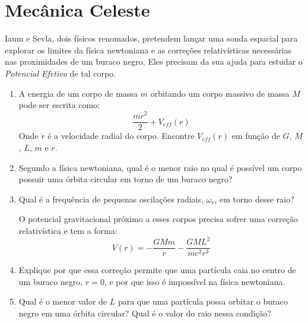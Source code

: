 \documentclass[11pt]{article}
\begin{document}
\section{Mecânica Celeste}
\begin{pproblem}
    Iaum e Sevla, dois físicos renomados, pretendem lançar uma sonda espacial para explorar os limites da física newtoniana e as correções relativísticas necessárias nas proximidades de um buraco negro. Eles precisam da sua ajuda para estudar o \textit{Potencial Efetivo} de tal corpo.
    \begin{enumerate}[label=\textbf{\alph*)}]
        \item A energia de um corpo de massa \(m\) orbitando um corpo massivo de massa \(M\) pode ser escrita como:
             \[
             \frac{m\dot r ^2}{2} + V_{eff}(r)
             \]
             Onde \(\dot r\) é a velocidade radial do corpo. Encontre \(V_{eff}(r)\) em função de \(G\), \(M\), \(L\), \(m\) e \(r\).

        \item Segundo a física newtoniana, qual é o menor raio no qual é possível um corpo possuir uma órbita circular em torno de um buraco negro?
    
        \item Qual é a frequência de pequenas oscilações radiais, \(\omega_r\), em torno desse raio?

        O potencial gravitacional próximo a esses corpos precisa sofrer uma correção relativística e tem a forma:
        \[
        V(r) = -\frac{GMm}{r} - \frac{GML^2}{mc^2r^3}
        \]

        \item Explique por que essa correção permite que uma partícula caia no centro de um buraco negro, \(r=0\), e por que isso é impossível na física newtoniana.
        
        \item Qual é o menor valor de \(L\) para que uma partícula possa orbitar o buraco negro em uma órbita circular? Qual é o valor do raio nessa condição?
        

\end{enumerate}
\end{pproblem}
\end{document}
